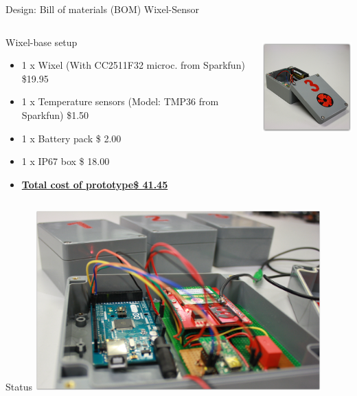 \documentclass{beamer}
\begin{document}
\begin{frame}{Design: Bill of materials (BOM) Wixel-Sensor}
\begin{columns}[T]
	\begin{column}[T]{6cm}
		Wixel-base setup
		\begin{itemize} \small
		\item 1 x Wixel   (With CC2511F32 microc. from Sparkfun) \$19.95
		\item 1 x Temperature sensors (Model: TMP36 from Sparkfun) \$1.50
		\item 1 x Battery pack \$ 2.00
		\item 1 x IP67 box \$ 18.00
		\item \textbf{\underline{Total cost of prototype\$ 41.45}} 
		\end{itemize}
	\end{column}
		\begin{column}[T]{4cm}
		\includegraphics[height=4cm]{graphics/Field_pictures/Wixel_sensor.JPG}
		\end{column}
\end{columns}
\end{frame}

\begin{frame}{Status}
\centering
\includegraphics[width=11cm]{graphics/Field_pictures/Open_project.jpg}
\end{frame}
\end{document}
